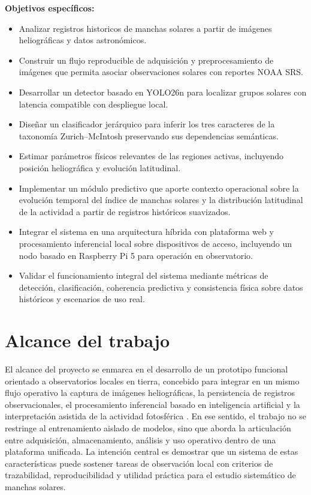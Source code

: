 \textbf{Objetivos específicos:}

\begin{itemize}
    \item Analizar registros historicos de manchas solares a partir de imágenes heliográficas y datos astronómicos.
    \item Construir un flujo reproducible de adquisición y preprocesamiento de imágenes que permita asociar observaciones solares con reportes NOAA SRS.
    \item Desarrollar un detector basado en YOLO26n para localizar grupos solares con latencia compatible con despliegue local.
    \item Diseñar un clasificador jerárquico para inferir los tres caracteres de la taxonomía Zurich--McIntosh preservando sus dependencias semánticas.
    \item Estimar parámetros físicos relevantes de las regiones activas, incluyendo posición heliográfica y evolución latitudinal.
    \item Implementar un módulo predictivo que aporte contexto operacional sobre la evolución temporal del índice de manchas solares y la distribución latitudinal de la actividad a partir de registros históricos suavizados.
    \item Integrar el sistema en una arquitectura híbrida con plataforma web y procesamiento inferencial local sobre dispositivos de acceso, incluyendo un nodo basado en Raspberry Pi 5 para operación en observatorio.
    \item Validar el funcionamiento integral del sistema mediante métricas de detección, clasificación, coherencia predictiva y consistencia física sobre datos históricos y escenarios de uso real.
\end{itemize}

\section{Alcance del trabajo}

El alcance del proyecto se enmarca en el desarrollo de un prototipo funcional orientado a observatorios locales en tierra, concebido para integrar en un mismo flujo operativo la captura de imágenes heliográficas, la persistencia de registros observacionales, el procesamiento inferencial basado en inteligencia artificial y la interpretación asistida de la actividad fotosférica \citep{hathaway2015solarcycle,sayez2023sunscc}. En ese sentido, el trabajo no se restringe al entrenamiento aislado de modelos, sino que aborda la articulación entre adquisición, almacenamiento, análisis y uso operativo dentro de una plataforma unificada. La intención central es demostrar que un sistema de estas características puede sostener tareas de observación local con criterios de trazabilidad, reproducibilidad y utilidad práctica para el estudio sistemático de manchas solares.

